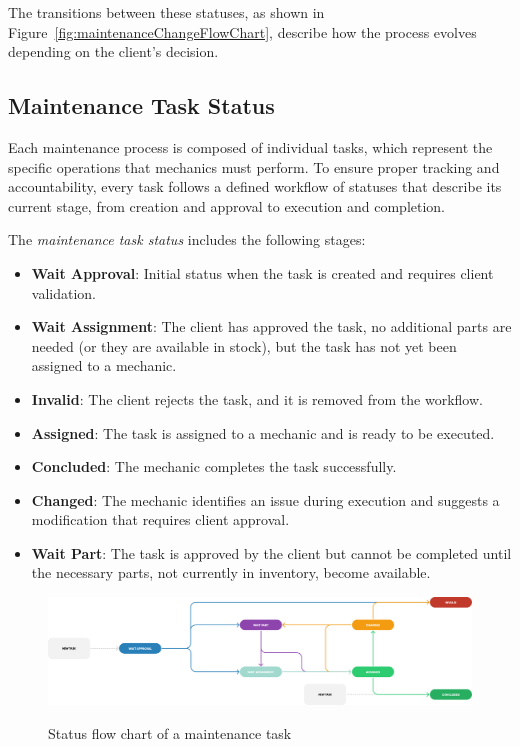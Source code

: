 The transitions between these statuses, as shown in Figure~\ref{fig:maintenanceChangeFlowChart}, describe how the process evolves depending on the client's decision.

\subsection{Maintenance Task Status} 

Each maintenance process is composed of individual tasks, which represent the specific operations that mechanics must perform. To ensure proper tracking and accountability, every task follows a defined workflow of statuses that describe its current stage, from creation and approval to execution and completion.

The \textit{maintenance task status} includes the following stages:
\begin{itemize}
\item \textbf{Wait Approval}: Initial status when the task is created and requires client validation.
\item \textbf{Wait Assignment}: The client has approved the task, no additional parts are needed (or they are available in stock), but the task has not yet been assigned to a mechanic.
\item \textbf{Invalid}: The client rejects the task, and it is removed from the workflow.
\item \textbf{Assigned}: The task is assigned to a mechanic and is ready to be executed.
\item \textbf{Concluded}: The mechanic completes the task successfully.
\item \textbf{Changed}: The mechanic identifies an issue during execution and suggests a modification that requires client approval.
\item \textbf{Wait Part}: The task is approved by the client but cannot be completed until the necessary parts, not currently in inventory, become available.
\end{itemize}


\begin{figure}[h]
  \caption{Status flow chart of a maintenance task}
  \centering
  \includegraphics[width=\textwidth]{figs/Status/MaintenanceTask/StatusDiagram}
  \label{fig:maintenanceTaskFlowChart}
\end{figure}

